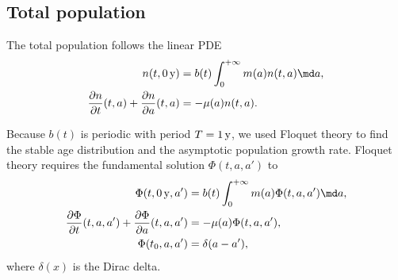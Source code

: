 \documentclass{jpmarticle}
\begin{document}
\subsection{Total population}

The total population follows the linear PDE
\begin{equation}
  \begin{split}
    n(t, \unit[0]{y})
    &= b(t) \int_0^{+\infty} m(a) n(t, a) \md a,
    \\
    \frac{\partial n}{\partial t}(t, a)
    + \frac{\partial n}{\partial a}(t, a)
    &= - \mu(a) n(t, a).
  \end{split}
\end{equation}

Because $b(t)$ is periodic with period $T = \unit[1]{y}$, we used
Floquet theory \autocite{parker_1992} to find the stable age
distribution and the asymptotic population growth rate. Floquet theory
requires the fundamental solution $\Phi(t, a, a')$ to
\begin{equation}
  \begin{split}
    \Phi(t, \unit[0]{y}, a')
    &= b(t) \int_0^{+\infty} m(a) \Phi(t, a, a') \md a,
    \\
    \frac{\partial \Phi}{\partial t}(t, a, a')
    + \frac{\partial \Phi}{\partial a}(t, a, a')
    &= - \mu(a) \Phi(t, a, a'),
    \\
    \Phi(t_0, a, a')
    &= \delta(a - a'),
  \end{split}
\end{equation}
where $\delta(x)$ is the Dirac delta.
\end{document}
